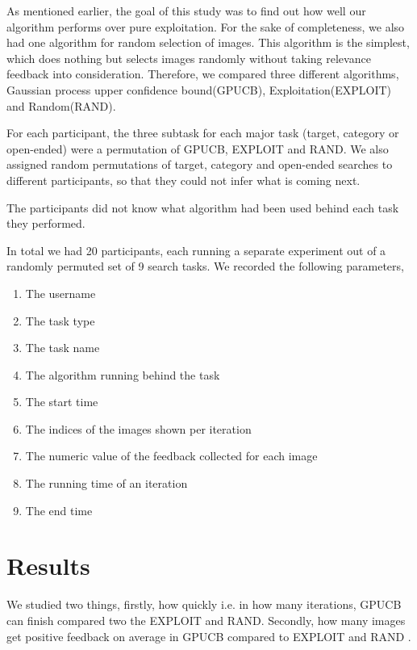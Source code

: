 \documentclass[english]{tktltiki}
\begin{document}
As mentioned earlier, the goal of this study was to find out how well our algorithm performs over pure exploitation. For the sake of completeness, we also had one algorithm for random selection of images. This algorithm is the simplest, which does nothing but selects images randomly without taking relevance feedback into consideration. Therefore, we compared three different algorithms, Gaussian process upper confidence bound(GPUCB), Exploitation(EXPLOIT) and Random(RAND).

For each participant, the three subtask for each major task (target, category or open-ended) were a permutation of GPUCB, EXPLOIT and RAND. We also assigned random permutations of target, category and open-ended searches to different participants, so that they could not infer what is coming next.

The participants did not know what algorithm had been used behind each task they performed.

In total we had 20 participants, each running a separate experiment out of a randomly permuted set of 9 search tasks. We recorded the following parameters,

\begin{enumerate}
	\item The username
	\item The task type
	\item The task name
	\item The algorithm running behind the task
	\item The start time
	\item The indices of the images shown per iteration
	\item The numeric value of the feedback collected for each image
	\item The running time of an iteration
	\item The end time
\end{enumerate}

\section{Results}

We studied two things, firstly, how quickly i.e. in how many iterations, GPUCB can finish compared two the EXPLOIT and RAND. Secondly, how many images get positive feedback on average in GPUCB compared to EXPLOIT and RAND \cite{explor_exploit_img_ret}.
\end{document}
